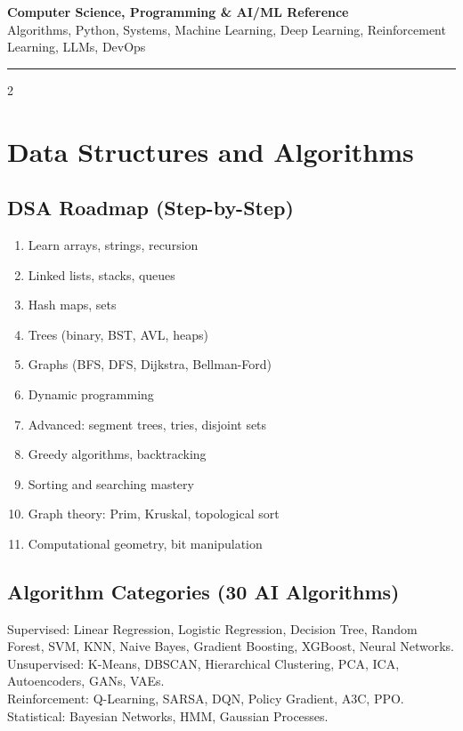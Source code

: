 \documentclass[10pt,a4paper]{article}
\begin{document}
\begin{center}
{\LARGE\bfseries\color{accent} Computer Science, Programming \& AI/ML Reference}\\[4pt]
{\small Algorithms, Python, Systems, Machine Learning, Deep Learning, Reinforcement Learning, LLMs, DevOps}
\end{center}
\vspace{4pt}\hrule\vspace{6pt}

\begin{multicols}{2}

\section{Data Structures and Algorithms}

\subsection{DSA Roadmap (Step-by-Step)}
\begin{enumerate}
\item Learn arrays, strings, recursion
\item Linked lists, stacks, queues
\item Hash maps, sets
\item Trees (binary, BST, AVL, heaps)
\item Graphs (BFS, DFS, Dijkstra, Bellman-Ford)
\item Dynamic programming
\item Advanced: segment trees, tries, disjoint sets
\item Greedy algorithms, backtracking
\item Sorting and searching mastery
\item Graph theory: Prim, Kruskal, topological sort
\item Computational geometry, bit manipulation
\end{enumerate}

\subsection{Algorithm Categories (30 AI Algorithms)}
Supervised: Linear Regression, Logistic Regression, Decision Tree, Random Forest, SVM, KNN, Naive Bayes, Gradient Boosting, XGBoost, Neural Networks.\\
Unsupervised: K-Means, DBSCAN, Hierarchical Clustering, PCA, ICA, Autoencoders, GANs, VAEs.\\
Reinforcement: Q-Learning, SARSA, DQN, Policy Gradient, A3C, PPO.\\
Statistical: Bayesian Networks, HMM, Gaussian Processes.


\end{multicols}
\end{document}
